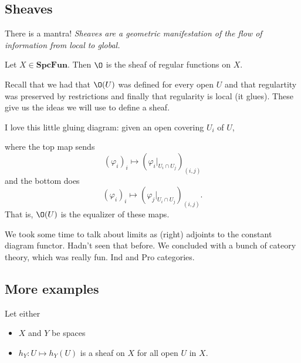 \documentclass[12pt]{article}
\newcommand{\SpcFun}{\mathbf{SpcFun}}
\begin{document}
\subsection{Sheaves}
There is a mantra! \textit{Sheaves are a geometric manifestation of the flow of information from local to global.}
\begin{ex}
	Let $X\in\SpcFun$. Then $\O$ is the sheaf of regular functions on $X$.
\end{ex}
\begin{rmk}
	Recall that we had that $\O(U)$ was defined for every open $U$ and that regulartity was preserved by 
	restrictions and finally that regularity is local (it glues). These give us the ideas we will use to define a sheaf.
\end{rmk}
I love this little gluing diagram: given an open covering $U_i$ of $U$,
\begin{center}
\end{center}
where the top map sends
\[(\varphi_i)_i\mapsto (\varphi_i|_{U_i\cap U_j})_{(i,j)}\]
and the bottom does 
\[(\varphi_i)_i\mapsto (\varphi_j|_{U_i\cap U_j})_{(i,j)}.\]
That is, $\O(U)$ is the equalizer of these maps.

We took some time to talk about limits as (right) adjoints to the constant diagram functor. Hadn't seen that before.
We concluded with a bunch of cateory theory, which was really fun. Ind and Pro categories.
\subsection{More examples}
Let either
\begin{itemize}
	\item $X$ and $Y$ be spaces
	\item $h_Y:U\mapsto h_Y(U)$ is a sheaf on $X$ for all open $U$ in $X$.
\end{itemize}
\end{document}
